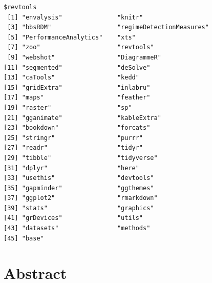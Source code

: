 \documentclass[12pt,twoside,openany]{reedthesis}
\begin{document}
\begin{verbatim}
$revtools
 [1] "envalysis"               "knitr"                  
 [3] "bbsRDM"                  "regimeDetectionMeasures"
 [5] "PerformanceAnalytics"    "xts"                    
 [7] "zoo"                     "revtools"               
 [9] "webshot"                 "DiagrammeR"             
[11] "segmented"               "deSolve"                
[13] "caTools"                 "kedd"                   
[15] "gridExtra"               "inlabru"                
[17] "maps"                    "feather"                
[19] "raster"                  "sp"                     
[21] "gganimate"               "kableExtra"             
[23] "bookdown"                "forcats"                
[25] "stringr"                 "purrr"                  
[27] "readr"                   "tidyr"                  
[29] "tibble"                  "tidyverse"              
[31] "dplyr"                   "here"                   
[33] "usethis"                 "devtools"               
[35] "gapminder"               "ggthemes"               
[37] "ggplot2"                 "rmarkdown"              
[39] "stats"                   "graphics"               
[41] "grDevices"               "utils"                  
[43] "datasets"                "methods"                
[45] "base"                   
\end{verbatim}
\hypertarget{abstract}{%
\chapter*{Abstract}\label{abstract}}
\end{document}
